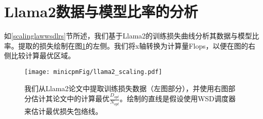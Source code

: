 \section{Llama2数据与模型比率的分析}
如\ref{scalinglawwsdlrs}节所述，我们基于Llama2的训练损失曲线分析其数据与模型比率。提取的损失绘制在图\ref{fig:llamascaling}的左侧。我们将x轴转换为计算量Flops，以便在图的右侧比较计算最优区域。

\begin{figure}
    \centering
    \texttt{[image: minicpmFig/llama2\_scaling.pdf]}
    \caption{我们从Llama2论文中提取训练损失数据（左图部分），并使用右图部分估计其论文中的计算最优$\frac{D_{opt}}{N_{opt}}$。绘制的直线是假设使用WSD调度器来估计最优损失包络线。}
    \label{fig:llamascaling}
\end{figure}
